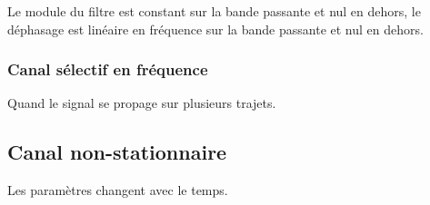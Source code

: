 \documentclass{article}
\begin{document}
Le module du filtre est constant sur la bande passante et nul en dehors, le déphasage est linéaire en fréquence sur la bande passante et nul en dehors.

\subsubsection{Canal sélectif en fréquence}

Quand le signal se propage sur plusieurs trajets.

\subsection{Canal non-stationnaire}
Les paramètres changent avec le temps.
\end{document}
